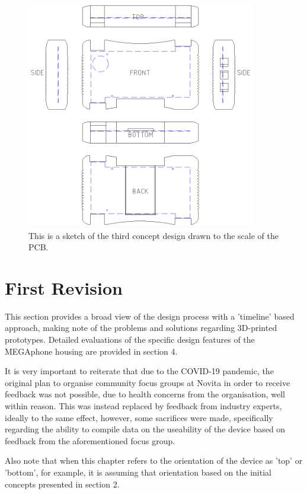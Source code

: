 \begin{figure} [h]
\centering
\includegraphics[width=10cm,height=10cm,keepaspectratio]{Figures/design3_sketch.png}
\caption{This is a sketch of the third concept design drawn to the scale of the PCB.}
\label{fig:Design_3}
\end{figure}

\section{First Revision}

This section provides a broad view of the design process with a 'timeline' based approach, making note of the problems and solutions regarding 3D-printed prototypes.
Detailed evaluations of the specific design features of the MEGAphone housing are provided in section 4.

It is very important to reiterate that due to the COVID-19 pandemic, the original plan to organise community focus groups at Novita \cite{novita} in order to receive feedback was not possible, due to health concerns from the organisation, well within reason.
This was instead replaced by feedback from industry experts, ideally to the same effect, however, some sacrifices were made, specifically regarding the ability to compile data on the useability of the device based on feedback from the aforementioned focus group.

Also note that when this chapter refers to the orientation of the device as 'top' or 'bottom', for example, it is assuming that orientation based on the initial concepts presented in section 2.

